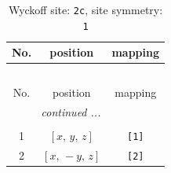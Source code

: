 \documentclass[fleqn,8pt]{jsarticle}
\begin{document}
\begin{longtable}{ccc}
\caption{Wyckoff site: {\tt 2c}, site symmetry: {\tt 1}}
 \\
 \hline \hline
No. & position & mapping \\ \hline \endfirsthead

\multicolumn{2}{l}{\tablename\ \thetable{}} \\
 \hline \hline
No. & position & mapping \\ \hline \endhead

 \hline \hline
\multicolumn{2}{r}{\footnotesize\it continued ...} \\ \endfoot

 \hline \hline
\multicolumn{2}{r}{} \\ \endlastfoot

1 & $\left[ x,\, y,\, z \right]$ & {\tt [1]} \\ \hline
2 & $\left[ x,\, - y,\, z \right]$ & {\tt [2]} \\
\end{longtable}
\end{document}
